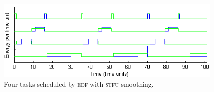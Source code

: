 \begin{figure}[tb]
\includegraphics[scale=0.64]{stfutasks.png}
\caption{Four tasks scheduled by \textsc{edf} with \textsc{stfu} smoothing.\label{fig:stfutaskplot}}
\end{figure}



































